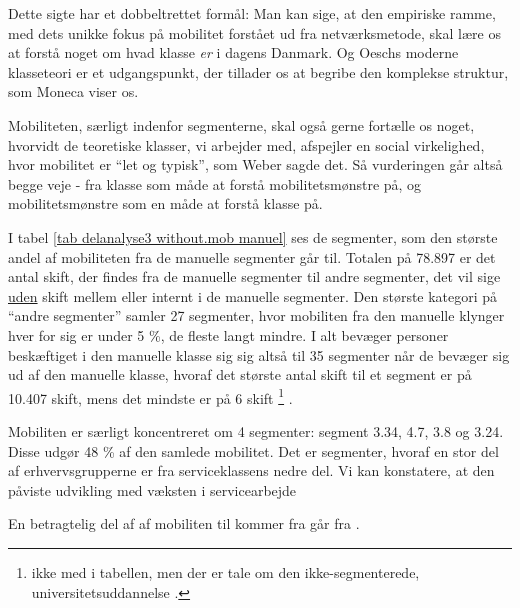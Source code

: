 Dette sigte har et dobbeltrettet formål: Man kan sige, at den empiriske ramme, med dets unikke fokus på mobilitet forstået ud fra netværksmetode, skal lære os at forstå noget om hvad klasse \emph{er} i dagens Danmark. Og Oeschs moderne klasseteori er et udgangspunkt, der tillader os at begribe den komplekse struktur, som Moneca viser os. 

Mobiliteten, særligt indenfor segmenterne, skal også gerne fortælle os noget, hvorvidt de teoretiske klasser, vi arbejder med, afspejler en social virkelighed, hvor mobilitet er “let og typisk”, som Weber sagde det. Så vurderingen går altså begge veje - fra klasse som måde at forstå mobilitetsmønstre på, og mobilitetsmønstre som en måde at forstå klasse på. 

I tabel \ref{tab delanalyse3 without.mob manuel} ses de segmenter, som den største andel af mobiliteten fra de manuelle segmenter går til.  Totalen på 78.897 er det antal skift, der findes fra de manuelle segmenter til andre segmenter, det vil sige \underline{uden} skift mellem eller internt i de manuelle segmenter. Den største kategori på “andre segmenter” samler 27 segmenter, hvor mobiliten fra den manuelle klynger hver for sig er under 5 \%, de fleste langt mindre. 
I alt bevæger personer beskæftiget i den manuelle klasse sig sig altså til 35 segmenter når de bevæger sig ud af den manuelle klasse, hvoraf det største antal skift til et segment er på 10.407 skift, mens det mindste er på 6 skift%
%
    \footnote{ ikke med i tabellen, men der er tale om den ikke-segmenterede, universitetsuddannelse .}%
%
. 

%

%

Mobiliten er særligt koncentreret om 4 segmenter: segment 3.34, 4.7, 3.8 og 3.24. Disse udgør 48 \% af den samlede mobilitet. Det er segmenter, hvoraf en stor del af erhvervsgrupperne er fra serviceklassens nedre del. Vi kan konstatere, at den påviste udvikling med væksten i servicearbejde









En betragtelig del af af mobiliten til  kommer fra   går fra . 




